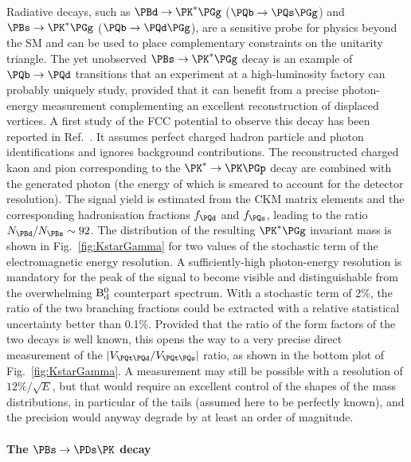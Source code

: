 Radiative decays, such as $\PBd \to \PK^* \PGg$ ($\PQb \to \PQs \PGg$) and $\PBs \to  \PK^* \PGg$ ($\PQb \to \PQd \PGg$), 
are a sensitive probe for physics beyond the SM and can be used to place complementary constraints on the unitarity triangle.
The yet unobserved $\PBs \to \PK^* \PGg$ decay is an example of $\PQb \to \PQd$ transitions that 
an experiment at a high-luminosity \PZ factory can probably uniquely study, 
provided that it can benefit from a precise photon-energy measurement complementing an excellent reconstruction of displaced vertices.
A first study of the FCC potential to observe this decay has been reported in Ref.~\cite{note_KstarGamma}. 
It assumes perfect charged hadron particle and photon identifications and ignores background contributions.
The reconstructed charged kaon and pion corresponding to the $\PK^* \to \PK \PGp$ decay 
are combined with the generated photon (the energy of which is smeared to account for the detector resolution).
The \PBs signal yield is estimated from the CKM matrix elements and the corresponding hadronisation fractions $f_{\PQd}$ and $f_{\PQs}$, 
leading to the ratio $N_{\PBd} / N_{\PBs} \sim 92$.
The distribution of the resulting ${\PK}^\ast \PGg$ invariant mass is shown in Fig.~\ref{fig:KstarGamma} 
for two values of the stochastic term of the electromagnetic energy resolution.
A sufficiently-high photon-energy resolution is mandatory for the peak of the \PBs signal to become visible 
and distinguishable from the overwhelming $\rm B^0_d$ counterpart spectrum. 
With a stochastic term of 2\%, the ratio of the two  branching fractions could be extracted with a relative statistical uncertainty better than 0.1\%. Provided that the ratio of the form factors of the two decays is well known, 
this opens the way to a very precise direct measurement of the $|V_{\PQt\PQd} / V_{\PQt\PQs}|$ ratio, as shown in the bottom plot of Fig.~\ref{fig:KstarGamma}.
A measurement may still be possible with a resolution of $12 \% / \sqrt{E}$, 
but that would require an excellent control of the shapes of the mass distributions, 
in particular of the tails (assumed here to be perfectly known), 
and the precision would anyway degrade by at least an order of magnitude.

\paragraph{The \texorpdfstring{$\PBs \to \PDs \PK$}{Bs to Ds K} decay}

